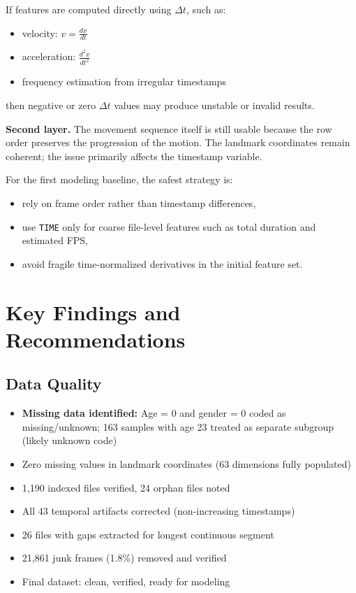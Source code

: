 \documentclass[11pt,twocolumn]{article}
\begin{document}
If features are computed directly using $\Delta t$, such as:

\begin{itemize}
\item velocity: $v = \frac{dx}{dt}$
\item acceleration: $\frac{d^2x}{dt^2}$
\item frequency estimation from irregular timestamps
\end{itemize}

then negative or zero $\Delta t$ values may produce unstable or invalid results.

\textbf{Second layer.}  
The movement sequence itself is still usable because the row order preserves the progression of the motion. The landmark coordinates remain coherent; the issue primarily affects the timestamp variable.

For the first modeling baseline, the safest strategy is:

\begin{itemize}
\item rely on frame order rather than timestamp differences,
\item use \texttt{TIME} only for coarse file-level features such as total duration and estimated FPS,
\item avoid fragile time-normalized derivatives in the initial feature set.
\end{itemize}
\section{Key Findings and Recommendations}

\subsection{Data Quality}

\begin{itemize}
\item \textbf{Missing data identified:} Age = 0 and gender = 0 coded as missing/unknown; 163 samples with age 23 treated as separate subgroup (likely unknown code)
\item Zero missing values in landmark coordinates (63 dimensions fully populated)
\item 1,190 indexed files verified, 24 orphan files noted
\item All 43 temporal artifacts corrected (non-increasing timestamps)
\item 26 files with gaps extracted for longest continuous segment
\item 21,861 junk frames (1.8\%) removed and verified
\item Final dataset: clean, verified, ready for modeling
\end{itemize}
\end{document}
